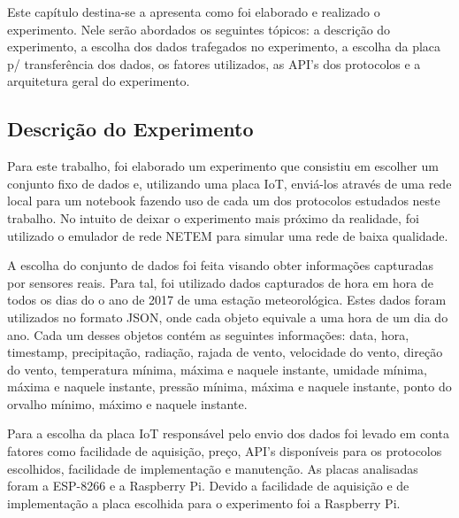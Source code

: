 Este capítulo destina-se a apresenta como foi elaborado e realizado o experimento. Nele serão abordados os seguintes tópicos: a descrição do experimento, a escolha dos dados trafegados no experimento, a escolha da placa p/ transferência dos dados, os fatores utilizados, as API's dos protocolos e a arquitetura geral do experimento.

\subsection{Descrição do Experimento}

Para este trabalho, foi elaborado um experimento que consistiu em escolher um conjunto fixo de dados e, utilizando uma placa IoT, enviá-los através de uma rede local para um notebook fazendo uso de cada um dos protocolos estudados neste trabalho. No intuito de deixar o experimento mais próximo da realidade, foi utilizado o emulador de rede NETEM para simular uma rede de baixa qualidade. 

A escolha do conjunto de dados foi feita visando obter informações capturadas por sensores reais. Para tal, foi utilizado dados capturados de hora em hora de todos os dias do o ano de 2017 de uma estação meteorológica. Estes dados foram utilizados no formato JSON, onde cada objeto equivale a uma hora de um dia do ano. Cada um desses objetos contém as seguintes informações: data, hora, timestamp, precipitação, radiação, rajada de vento, velocidade do vento, direção do vento, temperatura mínima, máxima e naquele instante, umidade mínima, máxima e naquele instante, pressão mínima, máxima e naquele instante, ponto do orvalho mínimo, máximo e naquele instante.

Para a escolha da placa IoT responsável pelo envio dos dados foi levado em conta fatores como facilidade de aquisição, preço, API's disponíveis para os protocolos escolhidos, facilidade de implementação e manutenção. As placas analisadas foram a ESP-8266 e a Raspberry Pi. Devido a facilidade de aquisição e de implementação a placa escolhida para o experimento foi a Raspberry Pi.
